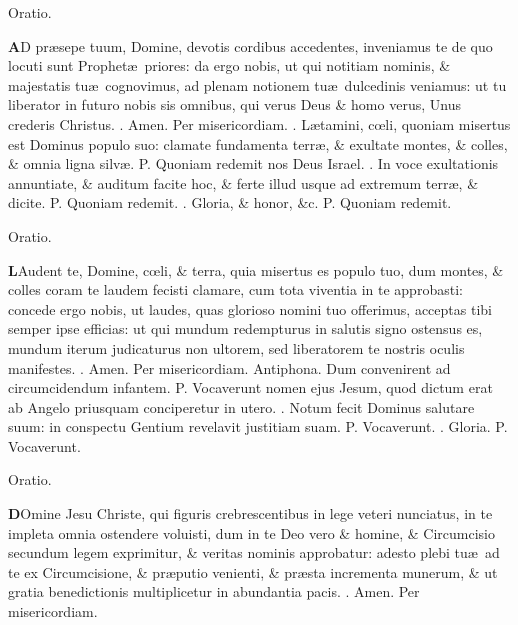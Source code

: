 \documentclass[letter,11pt]{book}
\makeatletter
\DeclareRobustCommand{\Vbar}{\vers@resp{-0.1em}{V}}
\DeclareRobustCommand{\Rbar}{\vers@resp{0pt}{R}}
\newcommand{\vers@resp@sym}{\raisebox{0.2ex}{\rotatebox[origin=c]{-20}{$\m@th\rceil$}}}
\newcommand{\vers@resp}[2]{%
  {\ooalign{\hidewidth\kern#1\vers@resp@sym\hidewidth\cr#2\cr}}%
}%
\def\P{\color{Red} P. \color{black}}
\def\V{\color{Red} \Vbar . \color{black}}
\def\R{\color{Red} \Rbar . \color{black}}
\makeatother
\begin{document}
\begin{multicols*}{2}
\vspace{-.5em} \begin{center} \color{Red} Oratio. \color{black} \end{center} \vspace{-.5em}
\lettrine[lines=2]{\bfseries \color{Red} A}{}D pr\ae sepe tuum, Domine, devotis cordibus accedentes, inveniamus te de quo locuti sunt Prophet\ae \ priores: da ergo nobis, ut qui notitiam nominis, \& majestatis tu\ae \ cognovimus, ad plenam notionem tu\ae \ dulcedinis veniamus: ut tu liberator in futuro nobis sis omnibus, qui verus Deus \& homo verus, Unus crederis Christus. \R Amen. Per misericordiam.
\newline \R L\ae tamini, c\oe li, quoniam misertus est Dominus populo suo: clamate fundamenta terr\ae , \& exultate montes, \& colles, \& omnia ligna silv\ae . \P Quoniam redemit nos Deus Israel. \V In voce exultationis annuntiate, \& auditum facite hoc, \& ferte illud usque ad extremum terr\ae , \& dicite. \P Quoniam redemit. \V Gloria, \& honor, \&c. \P Quoniam redemit.
\vspace{-.5em} \begin{center} \color{Red} Oratio. \color{black} \end{center} \vspace{-.5em}
\lettrine[lines=2]{\bfseries \color{Red} L}{}Audent te, Domine, c\oe li, \& terra, quia misertus es populo tuo, dum montes, \& colles coram te laudem fecisti clamare, cum tota viventia in te approbasti: concede ergo nobis, ut laudes, quas glorioso nomini tuo offerimus, acceptas tibi semper ipse efficias: ut qui mundum redempturus in salutis signo ostensus es, mundum iterum judicaturus non ultorem, sed liberatorem te nostris oculis manifestes. \R Amen. Per misericordiam.
\newline \color{Red} Antiphona. \color{black} Dum convenirent ad circumcidendum infantem. \P Vocaverunt nomen ejus Jesum, quod dictum erat ab Angelo priusquam conciperetur in utero. \V Notum fecit Dominus salutare suum: in conspectu Gentium revelavit justitiam suam. \P Vocaverunt. \V Gloria. \P Vocaverunt.
\vspace{-.5em} \begin{center} \color{Red} Oratio. \color{black} \end{center} \vspace{-.5em}
\lettrine[lines=2]{\bfseries \color{Red} D}{}Omine Jesu Christe, qui figuris crebrescentibus in lege veteri nunciatus, in te impleta omnia ostendere voluisti, dum in te Deo vero \& homine, \& Circumcisio secundum legem exprimitur, \& veritas nominis approbatur: adesto plebi tu\ae \ ad te ex Circumcisione, \& pr\ae putio venienti, \& pr\ae sta incrementa munerum, \& ut gratia benedictionis multiplicetur in abundantia pacis. \R Amen. Per misericordiam.

\end{multicols*}
\end{document}

